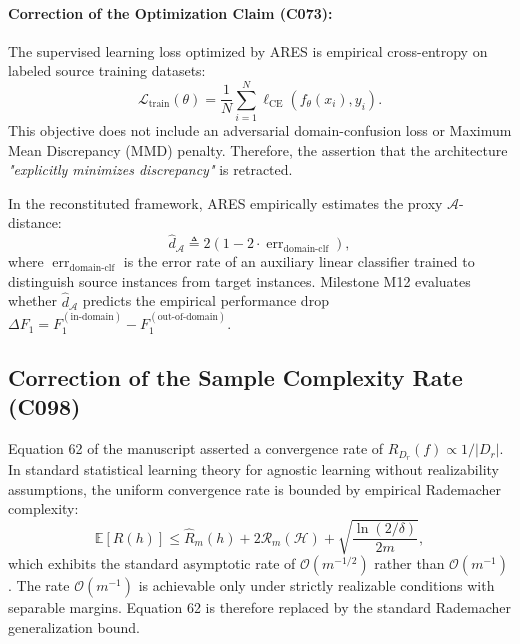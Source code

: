 \paragraph{Correction of the Optimization Claim (C073):}
The supervised learning loss optimized by ARES is empirical cross-entropy on labeled source training datasets:
\begin{equation}
\mathcal{L}_{\text{train}}(\theta) = \frac{1}{N} \sum_{i=1}^N \ell_{\text{CE}}(f_\theta(x_i), y_i).
\end{equation}
This objective does not include an adversarial domain-confusion loss or Maximum Mean Discrepancy (MMD) penalty. Therefore, the assertion that the architecture \emph{"explicitly minimizes discrepancy"} is retracted. 

In the reconstituted framework, ARES empirically estimates the proxy $\mathcal{A}$-distance:
\begin{equation}
\label{eq:proxy_a_distance}
\hat{d}_{\mathcal{A}} \triangleq 2(1 - 2 \cdot \operatorname{err}_{\text{domain-clf}}),
\end{equation}
where $\operatorname{err}_{\text{domain-clf}}$ is the error rate of an auxiliary linear classifier trained to distinguish source instances from target instances. Milestone M12 evaluates whether $\hat{d}_{\mathcal{A}}$ predicts the empirical performance drop $\Delta F_1 = F_1^{(\text{in-domain})} - F_1^{(\text{out-of-domain})}$.

\subsection{Correction of the Sample Complexity Rate (C098)}
Equation 62 of the manuscript asserted a convergence rate of $R_{D_r}(f) \propto 1 / |D_r|$. In standard statistical learning theory for agnostic learning without realizability assumptions, the uniform convergence rate is bounded by empirical Rademacher complexity:
\begin{equation}
\label{eq:rademacher_bound}
\mathbb{E}[R(h)] \le \hat{R}_m(h) + 2 \mathcal{R}_m(\mathcal{H}) + \sqrt{\frac{\ln(2/\delta)}{2m}},
\end{equation}
which exhibits the standard asymptotic rate of $\mathcal{O}(m^{-1/2})$ rather than $\mathcal{O}(m^{-1})$. The rate $\mathcal{O}(m^{-1})$ is achievable only under strictly realizable conditions with separable margins. Equation 62 is therefore replaced by the standard Rademacher generalization bound.

